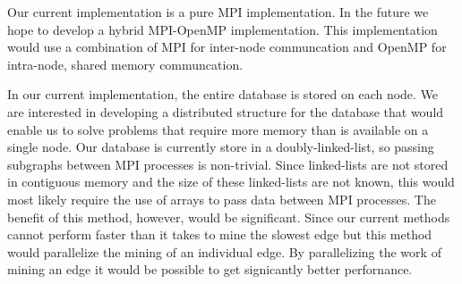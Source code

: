 Our current implementation is a pure MPI implementation. In the future we
hope to develop a hybrid MPI-OpenMP implementation. This implementation
would use a combination of MPI for inter-node communcation and OpenMP
for intra-node, shared memory communcation.

In our current implementation, the entire database is stored on each node.
We are interested in developing a distributed structure for the database that
would enable us to solve problems that require more memory than is available
on a single node. Our database is currently store in a doubly-linked-list, so
passing subgraphs between MPI processes is non-trivial. Since
linked-lists are not stored in contiguous memory and the size of these
linked-lists are not known, this would most likely require the use of arrays
to pass data between MPI processes.
The benefit of this method, however, would be significant. Since our current
methods cannot perform faster than it takes to mine the slowest edge but this
method would parallelize the mining of an individual edge. By parallelizing
the work of mining an edge it would be possible to get signicantly better
perfornance.
